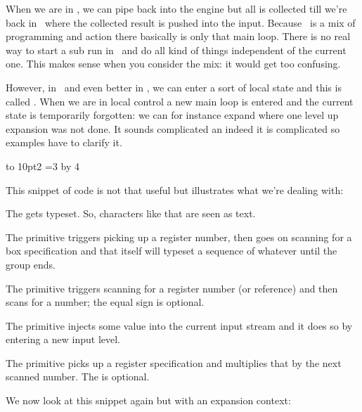 When we are in \LUA, we can pipe back into the engine but all is collected till
we're back in \TEX\ where the collected result is pushed into the input. Because
\TEX\ is a mix of programming and action there basically is only that main loop.
There is no real way to start a sub run in \LUA\ and do all kind of things
independent of the current one. This makes sense when you consider the mix: it
would get too confusing.

However, in \LUATEX\ and even better in \LUAMETATEX, we can enter a sort of local
state and this is called . When we are in local control a
new main loop is entered and the current state is temporarily forgotten: we can for
instance expand where one level up expansion was not done. It sounds complicated
an indeed it is complicated so examples have to clarify it.

 \hbox to 10pt{2} =3 \the{} \multiply{} by 4
\stoptyping

This snippet of code is not that useful but illustrates what we're dealing with:

\startitemize

\startitem
    The  gets typeset. So, characters like that are seen as text.
\stopitem

\startitem
    The \type {\setbox} primitive triggers picking up a register number, then
    goes on scanning for a box specification and that itself will typeset a
    sequence of whatever until the group ends.
\stopitem

\startitem
    The  primitive triggers scanning for a register number (or
    reference) and then scans for a number; the equal sign is optional.
\stopitem

\startitem
    The  primitive injects some value into the current input stream
    and it does so by entering a new input level.
\stopitem

\startitem
    The  primitive picks up a register specification and
    multiplies that by the next scanned number. The  is optional.
\stopitem

\stopitemize

We now look at this snippet again but with an expansion context:

\startbuffer[def]
\stopbuffer

\startbuffer[edef]
\edef{}
\stopbuffer

